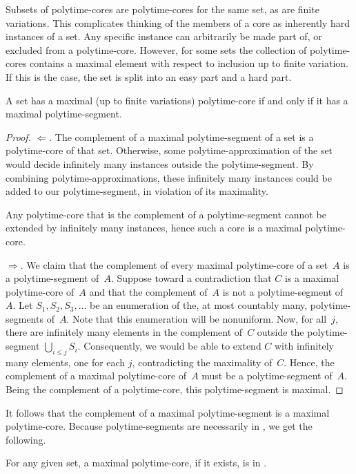 Subsets of polytime-cores are polytime-cores for the same set, as are finite variations.
This complicates thinking of the members of a core as inherently hard instances of a set.
Any specific instance can arbitrarily be made part of, or excluded from a polytime-core.
However, for some sets the collection of polytime-cores contains a maximal element with respect to inclusion up to finite variation.
If this is the case, the set is split into an easy part and a hard part.
\begin{theorem}
\label{thm:maximal}%
  A set has a maximal (up to finite variations) polytime-core if and only if it has a maximal polytime-segment.
\end{theorem}
\begin{proof}
  $\Longleftarrow$.
  The complement of a maximal polytime-segment of a set is a polytime-core of that set.
  Otherwise, some polytime-approximation of the set would decide infinitely many instances outside the polytime-segment.
  By combining polytime-approximations, these infinitely many instances could be added to our polytime-segment, in violation of its maximality.

  Any polytime-core that is the complement of a polytime-segment cannot be extended by infinitely many instances, hence such a core is a maximal polytime-core.

  $\Longrightarrow$.
  We claim that the complement of every maximal polytime-core of a set~$A$ is a polytime-segment of~$A$.
  Suppose toward a contradiction that $C$ is a maximal polytime-core of~$A$ and that the complement of~$A$ is not a polytime-segment of~$A$.
  Let $S_1, S_2, S_3, \ldots$ be an enumeration of the, at most countably many, polytime-segments of~$A$.
  Note that this enumeration will be nonuniform.
  Now, for all~$j$, there are infinitely many elements in the complement of~$C$ outside the polytime-segment $\bigcup_{i \le j} S_i$.
  Consequently, we would be able to extend $C$ with infinitely many elements, one for each $j$, contradicting the maximality of~$C$.
  Hence, the complement of a maximal polytime-core of~$A$ must be a polytime-segment of~$A$.
  Being the complement of a polytime-core, this polytime-segment is maximal.
\end{proof}

It follows that the complement of a maximal polytime-segment is a maximal polytime-core.
Because polytime-segments are necessarily in , we get the following.
\begin{corollary}
  For any given set, a maximal polytime-core, if it exists, is in .
\end{corollary}


